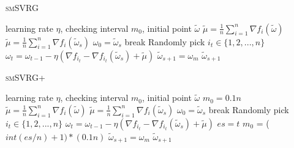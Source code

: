\documentclass[conference]{IEEEtran}
\begin{document}
 
 \begin{algorithm}
 	\caption{\textsc{smSVRG}}
	\label{smSVRG}
	\begin{algorithmic}[1]
	\Require learning rate $\eta$, checking interval $m_0$, initial point $\tilde{\omega}$
	\State $\tilde{\mu} = \frac{1}{n}\sum\limits_{i=1}^{n}\nabla f_{i}(\tilde{\omega})$
		\State $\tilde{\mu} = \frac{1}{n}\sum\limits_{i=1}^{n}\nabla f_{i}(\tilde{\omega}_{s})$
		\State $\omega_0 = \tilde{\omega}_s$
			\State break
			\EndIf
			\State Randomly pick $i_t\in\{1, 2, ..., n\}$
			\State $\omega_t = \omega_{t-1} - \eta(\nabla f_{i_t} - \nabla f_{i_t}(\tilde{\omega}_s)+\tilde{\mu})$
		\EndFor		
		\State $\tilde{\omega}_{s+1} = \omega_{m}$
	\EndFor
	\State \Return $\tilde{\omega}_{s+1}$
	\end{algorithmic}
\end{algorithm}

 \begin{algorithm}
 	\caption{\textsc{smSVRG+}}
	\label{smSVRG+}
	\begin{algorithmic}[1]
	\Require learning rate $\eta$, checking interval $m_0$, initial point $\tilde{\omega}$
	\Initial $m_0=0.1n$
	\State $\tilde{\mu} = \frac{1}{n}\sum\limits_{i=1}^{n}\nabla f_{i}(\tilde{\omega})$
		\State $\tilde{\mu} = \frac{1}{n}\sum\limits_{i=1}^{n}\nabla f_{i}(\tilde{\omega}_{s})$
		\State $\omega_0 = \tilde{\omega}_s$
			\State break
			\EndIf
			\State Randomly pick $i_t\in\{1, 2, ..., n\}$
			\State $\omega_t = \omega_{t-1} - \eta(\nabla f_{i_t} - \nabla f_{i_t}(\tilde{\omega}_s)+\tilde{\mu})$
		\EndFor
		\State $es = t$	
		\State $m_0$ = ($int(es/n)+1) * (0.1n)$
		\State $\tilde{\omega}_{s+1} = \omega_{m}$
	\EndFor
	\State \Return $\tilde{\omega}_{s+1}$
	\end{algorithmic}
\end{algorithm}
 
\end{document}
